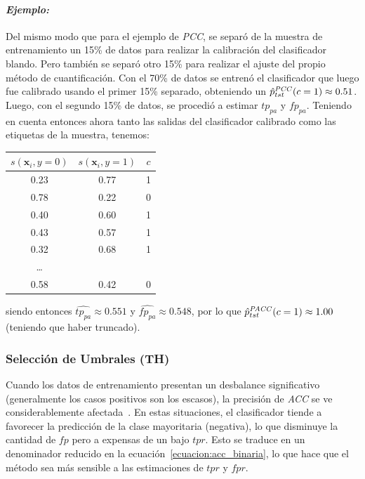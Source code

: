 \paragraph{\it Ejemplo:\/} Del mismo modo que para el ejemplo de {\it PCC}, se
separó de la muestra de entrenamiento un 15\% de datos para realizar la
calibración del clasificador blando. Pero también se separó otro 15\% para
realizar el ajuste del propio método de cuantificación. Con el 70\% de datos se
entrenó el clasificador que luego fue calibrado usando el primer 15\% separado,
obteniendo un \(\hat p^{\it PCC\/}_{tst}(c=1) \approx 0.51\). Luego, con el
segundo 15\% de datos, se procedió a estimar \(tp_{pa}\) y \(fp_{pa}\). Teniendo
en cuenta entonces ahora tanto las salidas del clasificador calibrado como las
etiquetas de la muestra, tenemos:
\begin{center}
    \begin{tabular}{ccc}
        \toprule
        \(s(\boldsymbol{x}_i, y=0)\) &  \(s(\boldsymbol{x}_i, y=1)\) & \(c\) \\
        \midrule
        0.23 &    0.77 &  1 \\
        0.78 &    0.22 &  0 \\
        0.40 &    0.60 &  1 \\
        0.43 &    0.57 &  1 \\
        0.32 &    0.68 &  1 \\
        \ldots              \\
        0.58 &    0.42 &  0 \\
     \bottomrule
        \bottomrule
        \end{tabular}
\end{center}

siendo entonces \(\hat{tp_{pa}} \approx 0.551\) y \(\hat{fp_{pa}} \approx
0.548\), por lo que \(\hat p^{\it PACC\/}_{tst}(c=1) \approx 1.00\) (teniendo
que haber truncado).

\subsubsection{Selección de Umbrales (TH)}\label{estimacion:umbrales}

Cuando los datos de entrenamiento presentan un desbalance significativo
(generalmente los casos positivos son los escasos), la precisión de {\it ACC\/}
se ve considerablemente afectada~\cite{forman2006quantifying}. En estas
situaciones, el clasificador tiende a favorecer la predicción de la clase
mayoritaria (negativa), lo que disminuye la cantidad de \(fp\) pero a expensas
de un bajo \(tpr\). Esto se traduce en un denominador reducido en la
ecuación~\ref{ecuacion:acc_binaria}, lo que hace que el método sea más sensible
a las estimaciones de \(tpr\) y \(fpr\).

